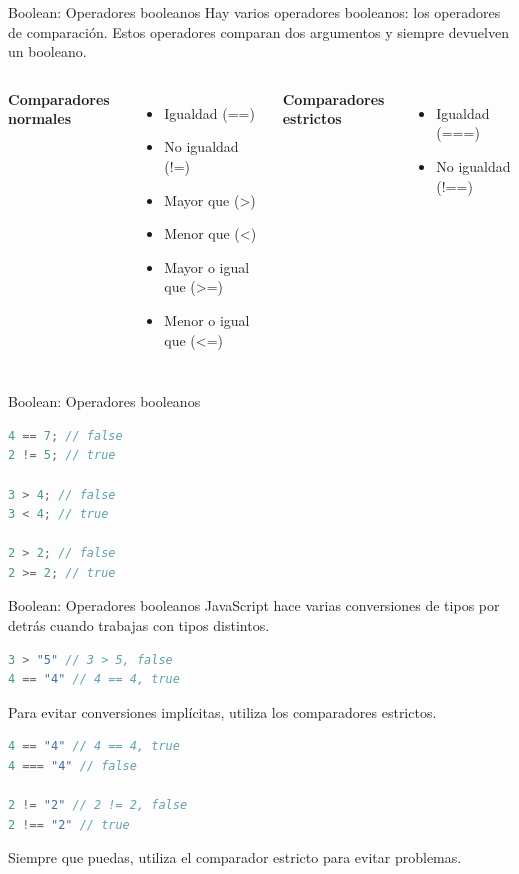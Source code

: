 \documentclass{beamer}
\begin{document}
\begin{frame}{Boolean: Operadores booleanos}
Hay varios operadores booleanos: los operadores de comparación. Estos operadores comparan dos argumentos y siempre devuelven un booleano. \bigskip

\begin{columns}[t, onlytextwidth]
                \textbf{Comparadores normales}
                \begin{itemize}
                    \item Igualdad (==)
                    \item No igualdad (!=)
                    \item Mayor que (>)
                    \item Menor que (<)
                    \item Mayor o igual que (>=)
                    \item Menor o igual que (<=)
                \end{itemize}
            
                \textbf{Comparadores estrictos}
                \begin{itemize}
                    \item Igualdad (===)
                    \item No igualdad (!==)
                \end{itemize}
        \end{columns}
\end{frame}

\begin{frame}[fragile]{Boolean: Operadores booleanos}
\begin{lstlisting}[language=JavaScript]
4 == 7; // false
2 != 5; // true

3 > 4; // false
3 < 4; // true

2 > 2; // false
2 >= 2; // true
\end{lstlisting}
\end{frame}

\begin{frame}[fragile]{Boolean: Operadores booleanos}
JavaScript hace varias conversiones de tipos por detrás cuando trabajas con tipos distintos.
\begin{lstlisting}[language=JavaScript]
3 > "5" // 3 > 5, false
4 == "4" // 4 == 4, true
\end{lstlisting}

Para evitar conversiones implícitas, utiliza los comparadores estrictos.
\begin{lstlisting}[language=JavaScript]
4 == "4" // 4 == 4, true
4 === "4" // false

2 != "2" // 2 != 2, false
2 !== "2" // true
\end{lstlisting}
Siempre que puedas, utiliza el comparador estricto para evitar problemas.


\end{frame}
\end{document}
